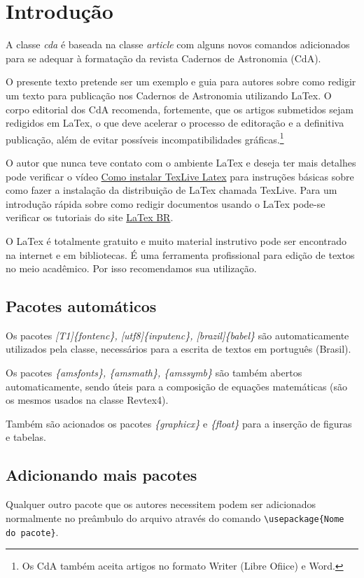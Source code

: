\documentclass{article}
\begin{document}
\section{Introdução}
A classe \textit{cda} é baseada na classe \textit{article} com alguns novos comandos adicionados para se adequar à formatação da revista Cadernos de Astronomia (CdA).

O presente texto pretende ser um exemplo e guia para autores sobre como redigir um texto para publicação nos Cadernos de Astronomia utilizando LaTex. O corpo editorial dos CdA recomenda, fortemente, que os artigos submetidos sejam redigidos em LaTex, o que deve acelerar o processo de editoração e a definitiva publicação, além de evitar possíveis incompatibilidades gráficas.\footnote{Os CdA também aceita artigos no formato Writer (Libre Ofiice) e Word.}

O autor que nunca teve contato com o ambiente LaTex e deseja ter mais detalhes pode verificar o vídeo \href{https://youtu.be/T9Q64dAzW20}{Como instalar TexLive Latex} para instruções básicas sobre como fazer a instalação da distribuição de LaTex chamada TexLive. Para um introdução rápida sobre como redigir documentos usando o LaTex pode-se verificar os tutoriais do site \href{http://latexbr.blogspot.com/2012/09/bibliografia-com-bibtex.html}{LaTex BR}. 

O LaTex é totalmente gratuito e muito material instrutivo pode ser encontrado na internet e em bibliotecas. É uma ferramenta profissional para edição de textos no meio acadêmico. Por isso recomendamos sua utilização.

\subsection{Pacotes automáticos}

Os pacotes \textit{[T1]\{fontenc\}, [utf8]\{inputenc\}, [brazil]\{babel\}} são automaticamente utilizados pela classe, necessários para a escrita de textos em português (Brasil).

Os pacotes \textit{\{amsfonts\}, \{amsmath\}, \{amssymb\}} são também abertos automaticamente, sendo úteis para a composição de equações matemáticas (são os mesmos usados na classe Revtex4).

Também são acionados os pacotes \textit{\{graphicx\}} e \textit{\{float\}} para a inserção de figuras e tabelas.

\subsection{Adicionando mais pacotes}
Qualquer outro pacote que os autores necessitem podem ser adicionados normalmente no preâmbulo do arquivo através do comando \verb|\usepackage{Nome do pacote}|.
\end{document}
